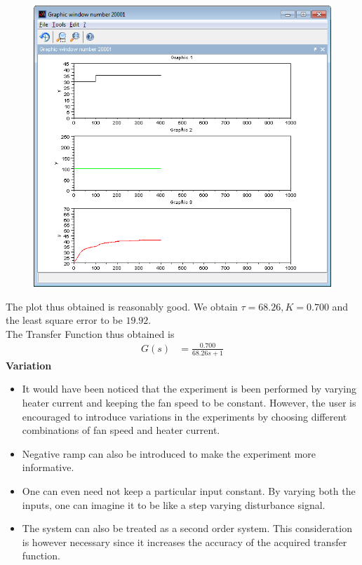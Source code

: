 \documentclass[12pt,prb]{article}
\begin{document}
\begin{figure}[h]
\centering
\includegraphics[width=\linewidth]{plot}
\caption{}
\end{figure}
The plot thus obtained is  reasonably good. We obtain $\tau = 68.26, K = 0.700$ and the least square error to be $ 19.92$.\\
The Transfer Function thus obtained is
\begin{align}
G(s)&=\frac{0.700}{68.26s+1}
\end{align}
\newpage
\textbf{Variation}\\
\begin{itemize}
\item It would have been noticed that the experiment is been performed by varying heater current and keeping the fan speed to be constant. However, the user is encouraged to introduce variations in the experiments by choosing different combinations of fan speed and heater current. 
\item Negative ramp can also be introduced to make the experiment more informative. 
\item One can even need not keep a particular input constant. By varying both the inputs, one can imagine it to be like a step varying disturbance signal.
\item The system can also be treated as a second order system. This consideration is however necessary since it increases the accuracy of the acquired transfer function.
\end{itemize}
\end{document}
